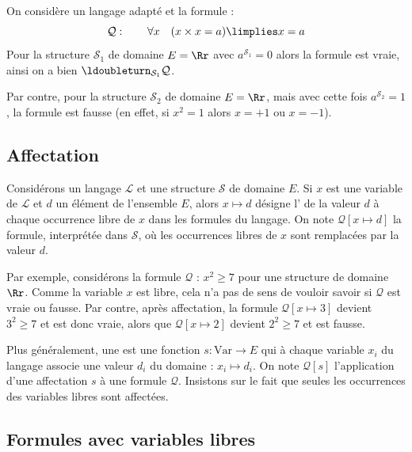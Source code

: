 \documentclass[11pt,class=report,crop=false]{standalone}
\begin{document}
\begin{exemple}
	On considère un langage adapté et la formule :
	\[
	\mathcal{Q} : \qquad \forall x \quad (x \times x = a) \limplies x = a
	\]
	Pour la structure $\mathcal{S}_1$ de domaine $E = \Rr$ avec $a^{\mathcal{S}_1} = 0$ alors la formule est vraie, ainsi on a bien $\ldoubleturn_{\mathcal{S}_1} \mathcal{Q}$.
	
	Par contre, pour la structure $\mathcal{S}_2$ de domaine $E = \Rr$, mais avec cette fois $a^{\mathcal{S}_2} = 1$, la formule est fausse (en effet, si $x^2=1$ alors $x=+1$ ou $x=-1$).
\end{exemple}


\subsection{Affectation}

Considérons un langage $\mathcal{L}$ et une structure $\mathcal{S}$ de domaine $E$.
Si $x$ est une variable de $\mathcal{L}$ et $d$ un élément de l'ensemble $E$, alors $x \mapsto d$ désigne l' de la valeur $d$ à chaque occurrence libre de $x$ dans les formules du langage.
On note $\mathcal{Q}[x \mapsto d]$ la formule, interprétée dans $\mathcal{S}$, où les occurrences libres de $x$ sont remplacées par la valeur $d$.

Par exemple, considérons la formule
$\mathcal{Q}$ : \og{}$x^2 \ge 7$\fg{}
pour une structure de domaine $\Rr$. Comme la variable $x$ est libre, cela n'a pas de sens de vouloir savoir si $\mathcal{Q}$ est vraie ou fausse.
Par contre, après affectation, la formule $\mathcal{Q}[x \mapsto 3]$ devient \og{}$3^2 \ge 7$\fg{} et est donc vraie, alors que $\mathcal{Q}[x \mapsto 2]$ devient \og{}$2^2 \ge 7$\fg{} et est fausse.

Plus généralement, une  est une fonction $s : \text{Var} \to E$ qui à chaque variable $x_i$ du langage associe une valeur $d_i$ du domaine : $x_i \mapsto d_i$. On note $\mathcal{Q}[s]$ l'application d'une affectation $s$ à une formule $\mathcal{Q}$. Insistons sur le fait que seules les occurrences des variables libres sont affectées.



\subsection{Formules avec variables libres}
\end{document}
